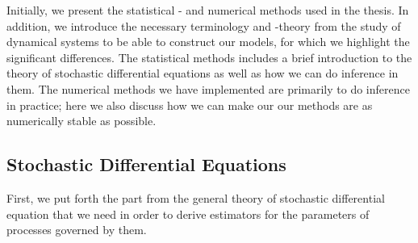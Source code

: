 Initially, we present the statistical - and numerical methods used in the thesis. In addition, we introduce the necessary terminology and -theory from the study of dynamical systems to be able to construct our models, for which we highlight the significant differences. The statistical methods includes a brief introduction to the theory of stochastic differential equations as well as how we can do inference in them. The numerical methods we have implemented are primarily to do inference in practice; here we also discuss how we can make our our methods are as numerically stable as possible.  
\subsection{Stochastic Differential Equations}
First, we put forth the part from the general theory of stochastic differential equation that we need in order to derive estimators for the parameters of processes governed by them. 
